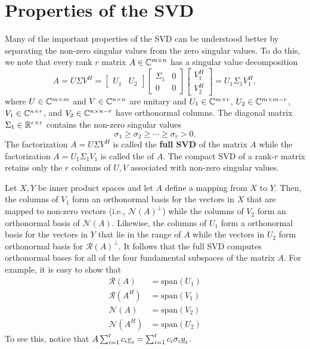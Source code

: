 \section{Properties of the SVD}

Many of the important properties of the SVD can be understood better by separating the non-zero singular values from the zero singular values.
To do this, we note that every rank $r$ matrix $A \in \mathbb{C}^{m \times n}$ has a singular value decomposition
\begin{equation*}
A = U \Sigma V^H
= \left[ \begin{array}{cc} U_1 & U_2 \end{array} \right]
\left[ \begin{array}{cc} \Sigma_1 & 0 \\ 0 & 0 \end{array} \right]
\left[ \begin{array}{c} V_1^H \\ V_2^H \end{array} \right]
= U_1 \Sigma_1 V_1^H,
\end{equation*}
where $U \in \mathbb{C}^{m \times m}$ and $V \in \mathbb{C}^{n \times n}$ are unitary and $U_1 \in \mathbb{C}^{m \times r}$, $U_2 \in \mathbb{C}^{m \times m-r}$, $V_1 \in \mathbb{C}^{n \times r}$, and $V_2 \in \mathbb{C}^{n \times n-r}$ have orthonormal columns.
The diagonal matrix $\Sigma_1 \in \mathbb{R}^{r \times r}$ contains the non-zero singular values
\[ \sigma_1 \geq \sigma_2 \geq \cdots \geq \sigma_r > 0. \]
The factorization $A = U \Sigma V^H$ is called the \textbf{full SVD} of the matrix $A$ while the factorization $A = U_1 \Sigma_1 V_1$ is called the  of $A$.
The compact SVD of a rank-$r$ matrix retains only the $r$ columns of $U,V$ associated with non-zero singular values.

Let $X,Y$ be inner product spaces and let $A$ define a mapping from $X$ to $Y$.
Then, the columns of $V_1$ form an orthonormal basis for the vectors in $X$ that are mapped to non-zero vectors (i.e., $\mathcal{N}(A)^\bot$) while the columns of $V_2$ form an orthonormal basis of $\mathcal{N}(A)$.
Likewise, the columns of $U_1$ form a orthonormal basis for the vectors in $Y$ that lie in the range of $A$ while the vectors in $U_2$ form orthonormal basis for $\mathcal{R}(A)^\bot$.
It follows that the full SVD computes orthonormal bases for all of the four fundamental subspaces of the matrix $A$.
For example, it is easy to show that
\begin{align*}
\mathcal{R}(A) &= \textrm{span} (U_1) \\
\mathcal{R}(A^H) &= \textrm{span} (V_1) \\
\mathcal{N}(A) &= \textrm{span} (V_2) \\
\mathcal{N}(A^H) &= \textrm{span} (U_2)
\end{align*}
To see this, notice that $A \sum_{i=1}^t c_i \underline{v}_i = \sum_{i=1}^t c_i \sigma_i \underline{u}_i$.

